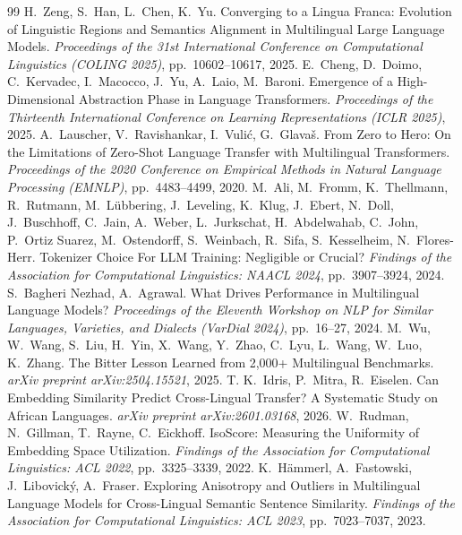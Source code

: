 \documentclass[11pt,a4paper]{article}
\begin{document}
\begin{thebibliography}{99}
H.~Zeng, S.~Han, L.~Chen, K.~Yu. Converging to a Lingua Franca: Evolution of Linguistic Regions and Semantics Alignment in Multilingual Large Language Models. \emph{Proceedings of the 31st International Conference on Computational Linguistics (COLING 2025)}, pp.~10602--10617, 2025.
E.~Cheng, D.~Doimo, C.~Kervadec, I.~Macocco, J.~Yu, A.~Laio, M.~Baroni. Emergence of a High-Dimensional Abstraction Phase in Language Transformers. \emph{Proceedings of the Thirteenth International Conference on Learning Representations (ICLR 2025)}, 2025.
A.~Lauscher, V.~Ravishankar, I.~Vuli\'c, G.~Glava\v{s}. From Zero to Hero: On the Limitations of Zero-Shot Language Transfer with Multilingual Transformers. \emph{Proceedings of the 2020 Conference on Empirical Methods in Natural Language Processing (EMNLP)}, pp.~4483--4499, 2020.
M.~Ali, M.~Fromm, K.~Thellmann, R.~Rutmann, M.~L\"ubbering, J.~Leveling, K.~Klug, J.~Ebert, N.~Doll, J.~Buschhoff, C.~Jain, A.~Weber, L.~Jurkschat, H.~Abdelwahab, C.~John, P.~Ortiz Suarez, M.~Ostendorff, S.~Weinbach, R.~Sifa, S.~Kesselheim, N.~Flores-Herr. Tokenizer Choice For LLM Training: Negligible or Crucial? \emph{Findings of the Association for Computational Linguistics: NAACL 2024}, pp.~3907--3924, 2024.
S.~Bagheri Nezhad, A.~Agrawal. What Drives Performance in Multilingual Language Models? \emph{Proceedings of the Eleventh Workshop on NLP for Similar Languages, Varieties, and Dialects (VarDial 2024)}, pp.~16--27, 2024.
M.~Wu, W.~Wang, S.~Liu, H.~Yin, X.~Wang, Y.~Zhao, C.~Lyu, L.~Wang, W.~Luo, K.~Zhang. The Bitter Lesson Learned from 2,000+ Multilingual Benchmarks. \emph{arXiv preprint arXiv:2504.15521}, 2025.
T. K.~Idris, P.~Mitra, R.~Eiselen. Can Embedding Similarity Predict Cross-Lingual Transfer? A Systematic Study on African Languages. \emph{arXiv preprint arXiv:2601.03168}, 2026.
W.~Rudman, N.~Gillman, T.~Rayne, C.~Eickhoff. IsoScore: Measuring the Uniformity of Embedding Space Utilization. \emph{Findings of the Association for Computational Linguistics: ACL 2022}, pp.~3325--3339, 2022.
K.~H\"ammerl, A.~Fastowski, J.~Libovick\'y, A.~Fraser. Exploring Anisotropy and Outliers in Multilingual Language Models for Cross-Lingual Semantic Sentence Similarity. \emph{Findings of the Association for Computational Linguistics: ACL 2023}, pp.~7023--7037, 2023.

\end{thebibliography}
\end{document}
